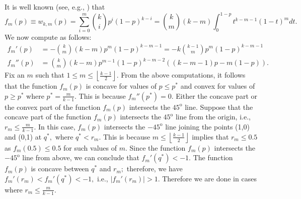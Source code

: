 \documentclass[12pt]{article}
\numberwithin{equation}{section}
\numberwithin{figure}{section}
\theoremstyle{definition}
\theoremstyle{plain}
\theoremstyle{plain}
\theoremstyle{plain}
\theoremstyle{remark}
\theoremstyle{plain}
\theoremstyle{plain}
\begin{document}
It is well known (see, e.g., \citealp{green1983fixed}) that
\[f_{m}(p)\equiv w_{k,m}(p) = \sum_{i=0}^{m}\binom{k}{i}p^i(1-p)^{k-i} = \binom{k}{m}(k-m)\int_{0}^{1-p}t^{k-m-1}(1-t)^m dt.\]
We now compute as follows:
\begin{align}\label{eq:wkmprime}
    f_{m}'(p) &= -\binom{k}{m}(k-m)p^m(1-p)^{k-m-1} = -k\binom{k-1}{m}p^m(1-p)^{k-m-1}\\
    f_{m}''(p) &= \binom{k}{m}(k-m)p^{m-1}(1-p)^{k-m-2}((k-m-1)p-m(1-p)).\nonumber
\end{align}
Fix an $m$ such that $1 \leq m\leq \left\lfloor \frac{k-1}{2}\right\rfloor.$ From the above computations, it follows that the function $f_{m}(p)$ is concave for values of $p \leq p^{\ast}$ and convex for values of $p \geq p^{\ast}$ where $p^{\ast} = \frac{m}{k-1}.$ This is because $f_m''(p^{\ast}) =0.$ Either the concave part or the convex part of the function $f_{m}(p)$ intersects the $45^{\text{o}}$ line. Suppose that the concave part of the function $f_{m}(p)$ intersects the $45^{\text{o}}$ line from the origin, i.e., $r_m \leq \frac{m}{k-1}.$ In this case, $f_{m}(p)$ intersects the $-45^{\text{o}}$ line joining the points (1,0) and (0,1) at $q^{\ast},$ where $q^{\ast}<r_m.$ This is because $m \leq \left\lfloor \frac{k-1}{2}\right\rfloor$ implies that $r_m \leq 0.5$ as $f_{m}(0.5) \leq 0.5$ for such values of $m.$ Since the function $f_{m}(p)$ intersects the $-45^{\text{o}}$ line from above, we can conclude that $f_{m}'(q^{\ast}) <-1.$ The function $f_{m}(p)$ is concave between $q^{\ast}$ and $r_m;$ therefore, we have $f_{m}'(r_m) < f_{m}'(q^{\ast}) < -1,$ i.e., $|f_{m}'(r_m)| >1.$ Therefore we are done in cases where $r_m \leq \frac{m}{k-1}.$
\end{document}
